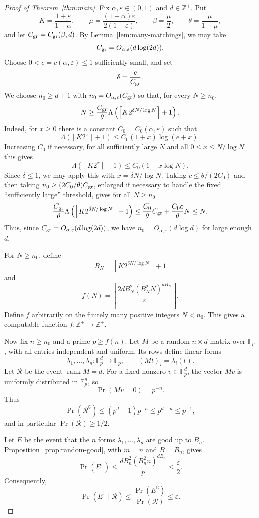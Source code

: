 \documentclass{amsart}
\theoremstyle{definition}
\theoremstyle{remark}
\newcommand{\Fp}{\mathbb{F}_p}
\newcommand{\Zpos}{\mathbb{Z}^{+}}
\DeclareMathOperator{\rank}{rank}
\begin{document}
\begin{proof}[Proof of Theorem~\ref{thm:main}]
Fix $\alpha,\varepsilon\in(0,1)$ and $d\in\Zpos$. Put
\[
K=\frac{1+\varepsilon}{1-\alpha},
\qquad
\mu=\frac{(1-\alpha)\varepsilon}{2(1+\varepsilon)},
\qquad
\beta=\frac\mu2,
\qquad
\theta=\frac{\mu}{1-\mu},
\]
and let $C_{\rm gr}=C_{\rm gr}(\beta,d)$. By Lemma~\ref{lem:many-matchings}, we may take
\[
C_{\rm gr}=O_{\alpha,\varepsilon}(d\log(2d)).
\]
Choose $0<c=c(\alpha,\varepsilon)\le1$ sufficiently small, and set
\[
\delta=\frac{c}{C_{\rm gr}}.
\]
We choose $n_0\ge d+1$ with $n_0=O_{\alpha,\varepsilon}(C_{\rm gr})$ so that, for every $N\ge n_0$,
\[
N\ge \frac{C_{\rm gr}}{\theta}\Lambda\left(\left\lceil K2^{\delta N/\log N}\right\rceil+1\right).
\]
Indeed, for $x\ge0$ there is a constant $C_0=C_0(\alpha,\varepsilon)$ such that
\[
\Lambda\left(\left\lceil K2^x\right\rceil+1\right)
\le C_0(1+x)\log(e+x).
\]
Increasing $C_0$ if necessary, for all sufficiently large $N$ and all $0\le x\le N/\log N$ this gives
\[
\Lambda\left(\left\lceil K2^x\right\rceil+1\right)
\le C_0(1+x\log N).
\]
Since $\delta\le1$, we may apply this with $x=\delta N/\log N$. Taking $c\le \theta/(2C_0)$ and then taking $n_0\ge (2C_0/\theta)C_{\rm gr}$, enlarged if necessary to handle the fixed ``sufficiently large'' threshold, gives for all $N\ge n_0$
\[
\frac{C_{\rm gr}}{\theta}\Lambda\left(\left\lceil K2^{\delta N/\log N}\right\rceil+1\right)
\le \frac{C_0}{\theta}C_{\rm gr}+\frac{C_0c}{\theta}N
\le N.
\]
Thus, since $C_{\rm gr}=O_{\alpha,\varepsilon}(d\log(2d))$, we have $n_0=O_{\alpha,\varepsilon}(d\log d)$ for large enough $d$.

For $N\ge n_0$, define
\[
B_N=\left\lceil K2^{\delta N/\log N}\right\rceil+1
\]
and
\[
f(N)=\left\lceil \frac{2dB_N^2(B_N^2N)^{dB_N}}{\varepsilon}\right\rceil.
\]
Define $f$ arbitrarily on the finitely many positive integers $N<n_0$. This gives a computable function $f:\Zpos\to\Zpos$.

Now fix $n\ge n_0$ and a prime $p\ge f(n)$. Let $M$ be a random $n\times d$ matrix over $\Fp$, with all entries independent and uniform. Its rows define linear forms
\[
\lambda_1,\ldots,\lambda_n:\Fp^d\to\Fp,
\qquad
(Mt)_i=\lambda_i(t).
\]
Let $\mathcal R$ be the event $\rank M=d$. For a fixed nonzero $v\in\Fp^d$, the vector $Mv$ is uniformly distributed in $\Fp^n$, so
\[
\Pr(Mv=0)=p^{-n}.
\]
Thus
\[
\Pr(\mathcal R^\complement)
\le (p^d-1)p^{-n}
\le p^{d-n}
\le p^{-1},
\]
and in particular $\Pr(\mathcal R)\ge 1/2$.

Let $E$ be the event that the $n$ forms $\lambda_1,\ldots,\lambda_n$ are good up to $B_n$. Proposition~\ref{prop:random-good}, with $m=n$ and $B=B_n$, gives
\[
\Pr(E^\complement)
\le
\frac{dB_n^2(B_n^2n)^{dB_n}}{p}
\le \frac{\varepsilon}{2}.
\]
Consequently,
\[
\Pr(E^\complement\mid\mathcal R)
\le \frac{\Pr(E^\complement)}{\Pr(\mathcal R)}
\le \varepsilon.
\]


\end{proof}
\end{document}
